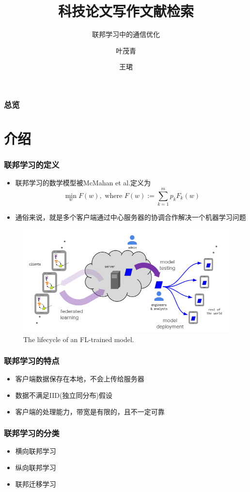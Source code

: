 \documentclass[hyperref={pdfpagelabels=false}]{beamer}
\title{科技论文写作文献检索}
\subtitle{联邦学习中的通信优化}
\author{叶茂青 \and 王珺}
\date{\displaydate{date}}
\begin{document}
\begin{frame}
\titlepage
\end{frame} 

\begin{frame}
	\frametitle{总览}
	\tableofcontents
\end{frame} 

\section{介绍}
\begin{frame}
	\tableofcontents[currentsection]
\end{frame} 

\begin{frame}
	\frametitle{联邦学习的定义}
	\begin{itemize}
		\item 联邦学习的数学模型被McMahan et al.\cite{McMahan2016}定义为$$\min _{w} F(w), \text { where } F(w):=\sum_{k=1}^{m} p_{k} F_{k}(w)$$
		\item 通俗来说，就是多个客户端通过中心服务器的协调合作解决一个机器学习问题
	\end{itemize}
	\begin{figure}
		\centering
		\includegraphics[width=.6\textwidth]{./figure/1.png}
		\caption{The lifecycle of an FL-trained model.\cite{Kairouz2019}}
	\end{figure}
\end{frame}


\begin{frame}
	\frametitle{联邦学习的特点}
	\begin{itemize}
		\item<+-> 客户端数据保存在本地，不会上传给服务器
		\item<+-> 数据不满足IID(独立同分布)假设
		\item<+-> 客户端的处理能力，带宽是有限的，且不一定可靠
	\end{itemize}
\end{frame}

\begin{frame}
	\frametitle{联邦学习的分类}
	\begin{itemize}
		\item 横向联邦学习
		\item 纵向联邦学习
		\item 联邦迁移学习
	\end{itemize}
\end{frame}
\end{document}
